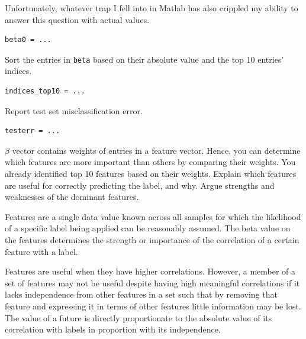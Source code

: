 \documentclass{article}
\begin{document}
Unfortunately, whatever trap I fell into in Matlab has also crippled my ability to answer this question with actual values.
\begin{verbatim}
beta0 = ...
\end{verbatim}
Sort the entries in \texttt{beta} based on their absolute value and the top 10 entries' indices.
\begin{verbatim}
indices_top10 = ...
\end{verbatim}
Report test set misclassification error.
\begin{verbatim}
testerr = ...
\end{verbatim}
\newproblem{2pt}
$\beta$ vector contains weights of entries in a feature vector. Hence, you can determine which features are more important than others by comparing their weights.
You already identified top 10 features based on their weights.
Explain which features are useful for correctly predicting the label, and why. 
Argue strengths and weaknesses of the dominant features.

Features are a single data value known across all samples for which the likelihood of a specific label being applied can be reasonably assumed.  The beta value on the features determines the strength or importance of the correlation of a certain feature with a label.

Features are useful when they have higher correlations.  However, a member of a set of features may not be useful despite having high meaningful correlations if it lacks independence from other features in a set such that by removing that feature and expressing it in terms of other features little information may be lost.  The value of a future is directly proportionate to the absolute value of its correlation with labels in proportion with its independence.
\end{document}
